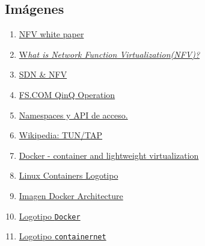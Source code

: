 \documentclass[12pt]{article}
\begin{document}
	\subsection*{Imágenes}
	\begin{enumerate}
		\item
		\label{img: nfv vs classic}
		\href{https://portal.etsi.org/nfv/nfv_white_paper.pdf}{NFV white paper}
		
		\item
		\label{img: nfv vs classic 2}
		\href{https://www.ciena.com/insights/articles/What-is-NFV-prx.html}{W\textit{hat is Network Function Virtualization(NFV)?}}
		
		\item
		\label{img: sdn vs nfv osi}
		\href{https://comparacloud.com/servicios-clouds/sdn-y-nfv/}{SDN \& NFV}
		
		\item
		\label{img: frame ethernet 802.1ad}
		\href{https://img-en.fs.com/file/user_manual/s3800-series-qinq-operation.pdf}{FS.COM QinQ Operation}
		
		\item 
		\label{bib:img1}\href{https://8gwifi.org/docs/linux-namespace.jsp}{Namespaces y API de acceso.}
		
		\item
		\label{bib_img: tun tap}
		\href{https://en.wikipedia.org/wiki/TUN/TAP}{Wikipedia: TUN/TAP}
		
		\item
		\label{bib_img: comparativa virt}
		\href{https://www.slideshare.net/janghoonsim/docker-container-and-lightweight-virtualization}{Docker - container and lightweight virtualization}
		
		\item
		\label{bib_img: lxc logo}
		\href{https://linuxcontainers.org/}{Linux Containers Logotipo}
		
		\item
		\label{bib_img: docker arch}
		\href{https://docs.docker.com/get-started/overview/}{Imagen Docker Architecture}
		
		\item
		\label{bib_img: docker logo}
		\href{https://commons.wikimedia.org/wiki/File:Docker_(container_engine)_logo.png}{Logotipo \texttt{Docker}}
		
		\item 
		\label{bib_img: containernet logo}
		\href{https://github.com/containernet/containernet}{Logotipo \texttt{containernet}}
		
		
		
	\end{enumerate}
\end{document}
